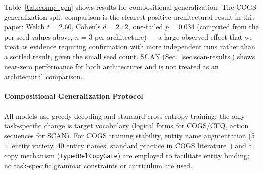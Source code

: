 \documentclass[review]{elsarticle}
\begin{document}
\begin{table}[t]
\centering
\caption{Compositional generalization, measured values (3 seeds, mean$\pm$std unless noted). $^\dagger$T5-Base from Furrer et al.~\cite{furrer2020compositional}. COGS columns use a copy mechanism (Sec.~\ref{sec:cogs-results}); SCAN uses the training configuration described in Sec.~\ref{sec:scan-results} (lr=$5{\times}10^{-5}$, FP32, patience=30) and both architectures are near-zero. CFQ evaluation deferred (see Sec.~\ref{sec:limitations}).}
\label{tab:comp_gen}
\end{table}

Table~\ref{tab:comp_gen} shows results for compositional generalization. The COGS generalization-split comparison is the clearest positive architectural result in this paper: Welch $t{=}2.60$, Cohen's $d{=}2.12$, one-tailed $p{=}0.034$ (computed from the per-seed values above, $n{=}3$ per architecture) --- a large observed effect that we treat as evidence requiring confirmation with more independent runs rather than a settled result, given the small seed count. SCAN (Sec.~\ref{sec:scan-results}) shows near-zero performance for both architectures and is not treated as an architectural comparison.

\paragraph{Compositional Generalization Protocol}
All models use greedy decoding and standard cross-entropy training; the only task-specific change is target vocabulary (logical forms for COGS/CFQ, action sequences for SCAN). For COGS training stability, entity name augmentation (5$\times$ entity variety, 40 entity names; standard practice in COGS literature~\cite{kim2020cogs}) and a copy mechanism (\texttt{TypedRelCopyGate}) are employed to facilitate entity binding; no task-specific grammar constraints or curriculum are used.
\end{document}
